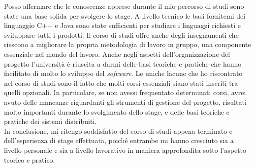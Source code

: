Posso affermare che le conoscenze apprese durante il mio percorso di studi sono state una base solida per svolgere lo stage. A livello tecnico le basi fornitemi dei linguaggio C++ e Java sono state sufficienti per studiare i linguaggi richiesti e sviluppare tutti i prodotti. 
Il corso di studi offre anche degli insegnamenti che riescono a migliorare la propria metodologia di lavoro in gruppo, una componente essenziale nel mondo del lavoro. 
Anche negli aspetti dell'organizzazione del progetto l'università è riuscita a darmi delle basi teoriche e pratiche che hanno facilitato di molto lo sviluppo del \textit{software}. 
Le uniche lacune che ho riscontrato nel corso di studi sono il fatto che molti corsi essenziali siano stati inseriti tra quelli opzionali. In particolare, se non avessi frequentato determinati corsi, avrei avuto delle mancanze riguardanti gli strumenti di gestione del progetto, risultati molto importanti durante lo svolgimento dello stage, e delle basi teoriche e pratiche dei sistemi distribuiti. \\

In conclusione, mi ritengo soddisfatto del corso di studi appena terminato e dell'esperienza di stage effettuata, poiché entrambe mi hanno cresciuto sia a livello personale e sia a livello lavorativo in maniera approfondita sotto l'aspetto teorico e pratico.
